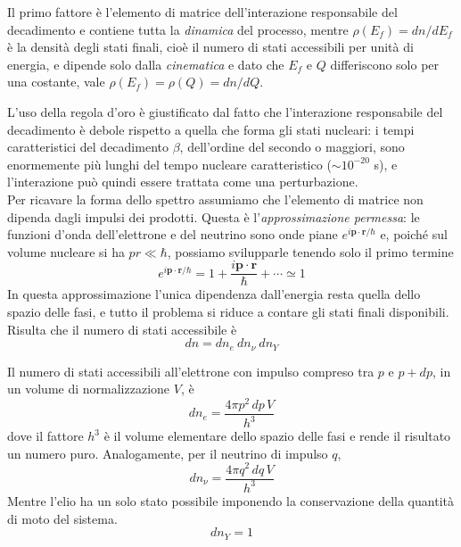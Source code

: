 Il primo fattore è l'elemento di matrice dell'interazione responsabile del decadimento e contiene tutta la \emph{dinamica} del processo, mentre $\rho(E_f) = dn/dE_f$ è la densità degli stati finali, cioè il numero di stati accessibili per unità di energia, e dipende solo dalla \emph{cinematica} e dato che $E_f$ e $Q$ differiscono solo per una costante, vale $\rho(E_f) = \rho(Q) = dn/dQ$. 

L'uso della regola d'oro è giustificato dal fatto che l'interazione responsabile del decadimento è debole rispetto a quella che forma gli stati nucleari: i tempi caratteristici del decadimento $\beta$, dell'ordine del secondo o maggiori, sono enormemente più lunghi del tempo nucleare caratteristico ($\sim 10^{-20}$ s), e l'interazione può quindi essere trattata come una perturbazione.\\

Per ricavare la forma dello spettro assumiamo che l'elemento di matrice non dipenda dagli impulsi dei prodotti. Questa è l'\emph{approssimazione permessa}: le funzioni d'onda dell'elettrone e del neutrino sono onde piane $e^{i \mathbf{p} \cdot \mathbf{r}/\hbar}$ e, poiché sul volume nucleare si ha $pr \ll \hbar$, possiamo svilupparle tenendo solo il primo termine
%
\begin{equation}
    e^{i \mathbf{p} \cdot \mathbf{r}/\hbar} = 1 + \frac{i \mathbf{p} \cdot \mathbf{r}}{\hbar} + \cdots \simeq 1
\end{equation}
In questa approssimazione l'unica dipendenza dall'energia resta quella dello spazio delle fasi, e tutto il problema si riduce a contare gli stati finali disponibili.\\

Risulta che il numero di stati accessibile è
%
\begin{equation}
    dn = dn_e \ dn_{\nu} \ dn_Y
\end{equation}

Il numero di stati accessibili all'elettrone con impulso compreso tra $p$ e $p+dp$, in un volume di normalizzazione $V$, è
%
\begin{equation}
    dn_e = \frac{4 \pi p^2 \, dp \, V}{h^3}
\end{equation}
dove il fattore $h^3$ è il volume elementare dello spazio delle fasi e rende il risultato un numero puro. Analogamente, per il neutrino di impulso $q$,
%
\begin{equation}
    dn_{\nu} = \frac{4 \pi q^2 \, dq \, V}{h^3}
\end{equation}
Mentre l'elio ha un solo stato possibile imponendo la conservazione della quantità di moto del sistema.
%
\begin{equation}
    dn_{Y} = 1
\end{equation}


